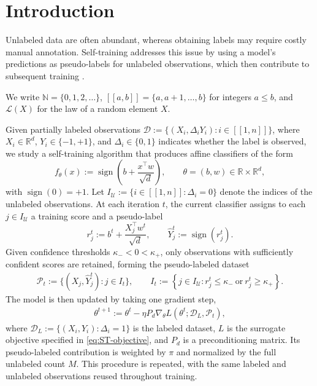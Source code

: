 \section{Introduction}
\label{sec:introduction}

Unlabeled data are often abundant, whereas obtaining labels may
require costly manual annotation. Self-training addresses this issue
by using a model's predictions as pseudo-labels for unlabeled
observations, which then contribute to subsequent training
\cite{lee2013pseudolabel}.

We write $\mathbb N=\{0,1,2,\ldots\}$,
$[\![a,b]\!]=\{a,a+1,\ldots,b\}$ for integers $a\leq b$,
and $\mathscr L(X)$ for the law of a random element $X$.

Given partially labeled observations
$\mathcal D:=\{(X_i,\Delta_iY_i):i\in[\![1,n]\!]\}$, where
$X_i\in\mathbb R^d$, $Y_i\in\{-1,+1\}$, and
$\Delta_i\in\{0,1\}$ indicates whether the label is observed,
we study a self-training algorithm that produces affine classifiers
of the form
\begin{equation}
    f_\theta(x)
    :=
    \operatorname{sign}\left(
        b+\frac{x^\top w}{\sqrt d}
    \right),
    \qquad
    \theta=(b,w)\in\mathbb R\times\mathbb R^d,
    \label{eq:def-classifier}
\end{equation}
with $\operatorname{sign}(0)=+1$.
Let
$I_{\mathcal U}:=\{i\in[\![1,n]\!]:\Delta_i=0\}$
denote the indices of the unlabeled observations.
At each iteration $t$, the current classifier assigns to each
$j\in I_{\mathcal U}$ a training score and a pseudo-label
\[
    r_j^t
    :=
    b^t+\frac{X_j^\top w^t}{\sqrt d},
    \qquad
    \widehat Y_j^t
    :=
    \operatorname{sign}(r_j^t).
\]
Given confidence thresholds $\kappa_-<0<\kappa_+$,
only observations with sufficiently confident scores are retained,
forming the pseudo-labeled dataset
\begin{align}
    \mathcal P_t
    :=
    \bigl\{(X_j,\widehat Y_j^t):j\in I_t\bigr\},
    \qquad
    I_t
    :=
    \left\{
        j\in I_{\mathcal U}:
        r_j^t\le\kappa_-
        \ \text{or}\
        r_j^t\ge\kappa_+
    \right\}.
    \label{eq:pl-dataset}
\end{align}
The model is then updated by taking one gradient step,
\begin{align}
    \theta^{t+1}
    :=
    \theta^t
    -
    \eta P_d
    \nabla_\theta L(\theta^t;\mathcal D_L,\mathcal P_t), 
    \label{eq:pl-gd-step}
\end{align}
where
$\mathcal D_L:=\{(X_i,Y_i):\Delta_i=1\}$
is the labeled dataset, $L$ is the surrogate objective
specified in \eqref{eq:ST-objective}, and $P_d$ is a
preconditioning matrix. Its pseudo-labeled contribution is
weighted by $\pi$ and normalized by the full unlabeled count $M$.
This procedure is repeated, with the same labeled and unlabeled
observations reused throughout training.

